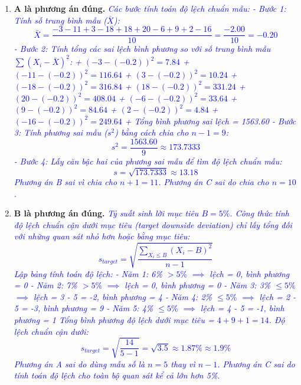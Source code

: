 \begin{enumerate}
	\item \textbf{A là phương án đúng.} \textcolor{blue}{\textit{Các bước tính toán độ lệch chuẩn mẫu:
	      - Bước 1: Tính số trung bình mẫu ($\bar{X}$):
	        \[
	        \bar{X} = \frac{-3 - 11 + 3 - 18 + 18 + 20 - 6 + 9 + 2 - 16}{10} = \frac{-2.00}{10} = -0.20
	        \]
	      - Bước 2: Tính tổng các sai lệch bình phương so với số trung bình mẫu $\sum (X_i - \bar{X})^2$:
	        + $(-3 - (-0.2))^2 = 7.84$
	        + $(-11 - (-0.2))^2 = 116.64$
	        + $(3 - (-0.2))^2 = 10.24$
	        + $(-18 - (-0.2))^2 = 316.84$
	        + $(18 - (-0.2))^2 = 331.24$
	        + $(20 - (-0.2))^2 = 408.04$
	        + $(-6 - (-0.2))^2 = 33.64$
	        + $(9 - (-0.2))^2 = 84.64$
	        + $(2 - (-0.2))^2 = 4.84$
	        + $(-16 - (-0.2))^2 = 249.64$
	        + Tổng bình phương sai lệch = 1563.60
	      - Bước 3: Tính phương sai mẫu ($s^2$) bằng cách chia cho $n-1 = 9$:
	        \[
	        s^2 = \frac{1563.60}{9} \approx 173.7333
	        \]
	      - Bước 4: Lấy căn bậc hai của phương sai mẫu để tìm độ lệch chuẩn mẫu:
	        \[
	        s = \sqrt{173.7333} \approx 13.18
	        \]
	      Phương án B sai vì chia cho $n+1 = 11$. Phương án C sai do chia cho $n = 10$.}}

	\item \textbf{B là phương án đúng.} \textcolor{blue}{\textit{Tỷ suất sinh lời mục tiêu $B = 5\%$. Công thức tính độ lệch chuẩn cận dưới mục tiêu (target downside deviation) chỉ lấy tổng đối với những quan sát nhỏ hơn hoặc bằng mục tiêu:
	      \[
	      s_{target} = \sqrt{\frac{\sum_{X_i \le B} (X_i - B)^2}{n - 1}}
	      \]
	      Lập bảng tính toán độ lệch:
	      - Năm 1: 6\% $> 5\%$ $\implies$ lệch = 0, bình phương = 0
	      - Năm 2: 7\% $> 5\%$ $\implies$ lệch = 0, bình phương = 0
	      - Năm 3: 3\% $\le 5\%$ $\implies$ lệch = 3 - 5 = -2, bình phương = 4
	      - Năm 4: 2\% $\le 5\%$ $\implies$ lệch = 2 - 5 = -3, bình phương = 9
	      - Năm 5: 4\% $\le 5\%$ $\implies$ lệch = 4 - 5 = -1, bình phương = 1
	      Tổng bình phương độ lệch dưới mục tiêu = $4 + 9 + 1 = 14$.
	      Độ lệch chuẩn cận dưới:
	      \[
	      s_{target} = \sqrt{\frac{14}{5 - 1}} = \sqrt{3.5} \approx 1.87\% \approx 1.9\%
	      \]
	      Phương án A sai do dùng mẫu số là $n=5$ thay vì $n-1$. Phương án C sai do tính toán độ lệch cho toàn bộ quan sát kể cả lớn hơn 5\%.}}


\end{enumerate}
